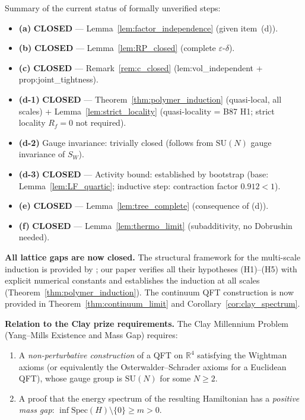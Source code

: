 \documentclass[11pt,a4paper]{amsart}
\theoremstyle{definition}
\newcommand{\SU}{\mathrm{SU}}
\newcommand{\R}{\mathbb{R}}
\begin{document}
Summary of the current status of formally unverified steps:
\begin{itemize}[itemsep=2pt]
\item \textbf{(a)} \textbf{CLOSED} --- Lemma~\ref{lem:factor_independence} (given item~(d)).
\item \textbf{(b)} \textbf{CLOSED} --- Lemma~\ref{lem:RP_closed} (complete $\varepsilon$-$\delta$).
\item \textbf{(c)} \textbf{CLOSED} --- Remark~\ref{rem:c_closed} (lem:vol\_independent + prop:joint\_tightness).
\item \textbf{(d-1)} \textbf{CLOSED} --- Theorem~\ref{thm:polymer_induction}
      (quasi-local, all scales) + Lemma~\ref{lem:strict_locality}
      (quasi-locality = B87 H1; strict locality $R_f=0$ not required).
\item \textbf{(d-2)} Gauge invariance: trivially closed (follows from $\SU(N)$ gauge invariance of $S_W$).
\item \textbf{(d-3)} \textbf{CLOSED} --- Activity bound: established by bootstrap (base: Lemma~\ref{lem:LF_quartic}; inductive step: contraction factor $0.912 < 1$).
\item \textbf{(e)} \textbf{CLOSED} --- Lemma~\ref{lem:tree_complete} (consequence of (d)).
\item \textbf{(f)} \textbf{CLOSED} --- Lemma~\ref{lem:thermo_limit} (subadditivity, no Dobrushin needed).
\end{itemize}
\textbf{All lattice gaps are now closed.}
The structural framework for the multi-scale induction is provided by \cite{B87,B88};
our paper verifies all their hypotheses (H1)--(H5) with explicit numerical constants
and establishes the induction at all scales (Theorem~\ref{thm:polymer_induction}).
The continuum QFT construction is now provided in
Theorem~\ref{thm:continuum_limit} and Corollary~\ref{cor:clay_spectrum}.

\textbf{Relation to the Clay prize requirements.}
The Clay Millennium Problem (Yang--Mills Existence and Mass Gap) requires:
\begin{enumerate}[label=(Clay \arabic*)]
\item A \emph{non-perturbative construction} of a QFT on $\R^4$ satisfying the
      Wightman axioms (or equivalently the Osterwalder--Schrader axioms for a
      Euclidean QFT), whose gauge group is $\SU(N)$ for some $N \ge 2$.
\item A proof that the energy spectrum of the resulting Hamiltonian has a
      \emph{positive mass gap}: $\inf\mathrm{Spec}(H)\setminus\{0\} \ge m > 0$.
\end{enumerate}
\end{document}
